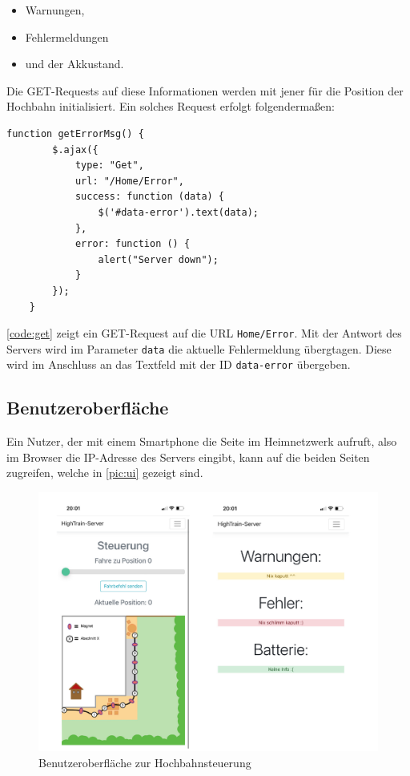 \begin{center}
	\begin{itemize}
		\item Warnungen,
		\item Fehlermeldungen
		\item und der Akkustand.
	\end{itemize}
\end{center}
\newpage
Die GET-Requests auf diese Informationen werden mit jener für die Position der Hochbahn initialisiert. Ein solches Request erfolgt folgendermaßen:

\begin{lstlisting}[language=html, style=dhpaperdefault]
	function getErrorMsg() {
		$.ajax({
			type: "Get",
			url: "/Home/Error",
			success: function (data) {
				$('#data-error').text(data);
			},
			error: function () {
				alert("Server down");
			}
		});
    }
\end{lstlisting}
\vspace{0.5cm}
\autoref{code:get} zeigt ein GET-Request auf die URL \texttt{Home/Error}. Mit der Antwort des Servers wird im Parameter \texttt{data} die aktuelle Fehlermeldung übergtagen. Diese wird im Anschluss an das Textfeld mit der ID \texttt{data-error} übergeben. 
\subsection{Benutzeroberfläche}
Ein Nutzer, der mit einem Smartphone die Seite im Heimnetzwerk aufruft, also im Browser die IP-Adresse des Servers eingibt, kann auf die beiden Seiten zugreifen, welche in \autoref{pic:ui} gezeigt sind.

\begin{figure}[h]
	\begin{center}
		\includegraphics[width=\textwidth]{UI.pdf}
		\caption{\label{pic:ui}Benutzeroberfläche zur Hochbahnsteuerung}
	\end{center}
\end{figure}


